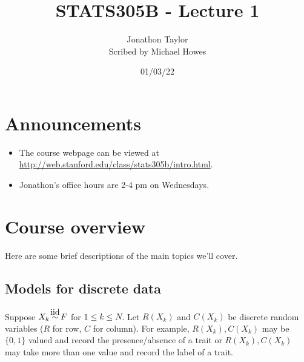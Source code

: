 




\title{STATS305B - Lecture 1}
\author{Jonathon Taylor\\ Scribed by Michael Howes}
\date{01/03/22}

\pagestyle{fancy}
\fancyhf{}


\maketitle
\tableofcontents
\section{Announcements}
\begin{itemize}
    \item The course webpage can be viewed at \href{http://web.stanford.edu/class/stats305b/intro.html}{http://web.stanford.edu/class/stats305b/intro.html}.
    \item Jonathon's office hours are 2-4 pm on Wednesdays.
\end{itemize}
\section{Course overview}
Here are some brief descriptions of the main topics we'll cover.
\subsection{Models for discrete data}
Suppose $X_k \iid F$ for $1 \le k \le N$.
Let $R(X_k)$ and $C(X_k)$ be discrete random variables ($R$ for row, $C$ for column). For example, $R(X_k), C(X_k)$ may be $\{0,1\}$ valued and record the presence/absence of a trait or $R(X_k), C(X_k)$ may take more than one value and record the label of a trait.

